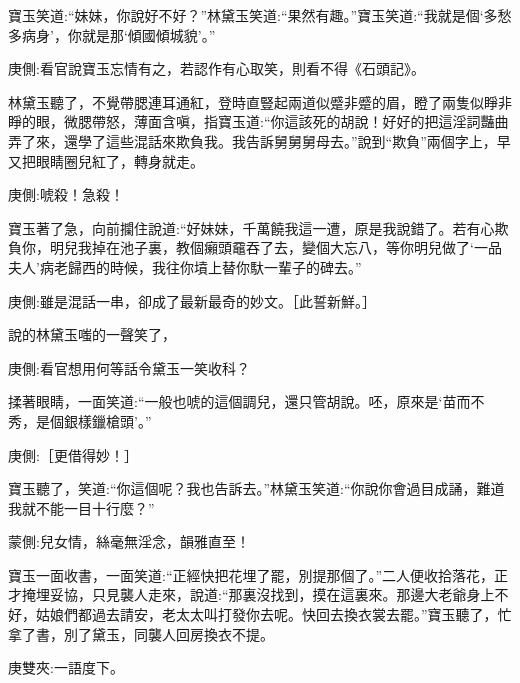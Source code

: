 \begin{parag}
    寶玉笑道:“妹妹，你說好不好？”林黛玉笑道:“果然有趣。”寶玉笑道:“我就是個‘多愁多病身’，你就是那‘傾國傾城貌’。”\begin{note}庚側:看官說寶玉忘情有之，若認作有心取笑，則看不得《石頭記》。\end{note}林黛玉聽了，不覺帶腮連耳通紅，登時直豎起兩道似蹙非蹙的眉，瞪了兩隻似睜非睜的眼，微腮帶怒，薄面含嗔，指寶玉道:“你這該死的胡說！好好的把這淫詞豔曲弄了來，還學了這些混話來欺負我。我告訴舅舅舅母去。”說到“欺負”兩個字上，早又把眼睛圈兒紅了，轉身就走。\begin{note}庚側:唬殺！急殺！\end{note}寶玉著了急，向前攔住說道:“好妹妹，千萬饒我這一遭，原是我說錯了。若有心欺負你，明兒我掉在池子裏，教個癩頭黿吞了去，變個大忘八，等你明兒做了‘一品夫人’病老歸西的時候，我往你墳上替你馱一輩子的碑去。”\begin{note}庚側:雖是混話一串，卻成了最新最奇的妙文。［此誓新鮮。］\end{note}說的林黛玉嗤的一聲笑了，\begin{note}庚側:看官想用何等話令黛玉一笑收科？\end{note}揉著眼睛，一面笑道:“一般也唬的這個調兒，還只管胡說。呸，原來是‘苗而不秀，是個銀樣鑞槍頭’。”\begin{note}庚側:［更借得妙！］\end{note}寶玉聽了，笑道:“你這個呢？我也告訴去。”林黛玉笑道:“你說你會過目成誦，難道我就不能一目十行麼？”\begin{note}蒙側:兒女情，絲毫無淫念，韻雅直至！\end{note}
\end{parag}


\begin{parag}
    寶玉一面收書，一面笑道:“正經快把花埋了罷，別提那個了。”二人便收拾落花，正才掩埋妥協，只見襲人走來，說道:“那裏沒找到，摸在這裏來。那邊大老爺身上不好，姑娘們都過去請安，老太太叫打發你去呢。快回去換衣裳去罷。”寶玉聽了，忙拿了書，別了黛玉，同襲人回房換衣不提。\begin{note}庚雙夾:一語度下。\end{note}
\end{parag}


